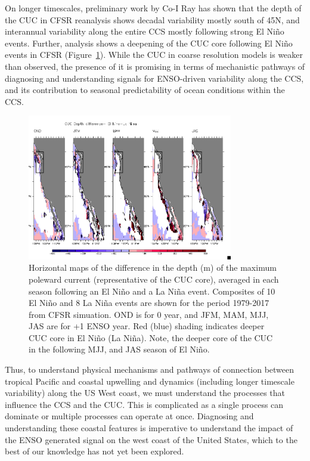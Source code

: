 On longer timescales, preliminary work by Co-I Ray has shown that the depth of the CUC in CFSR reanalysis shows decadal variability mostly south of 45N, and interannual variability along the entire CCS mostly following strong El Ni{\~n}o events. Further, analysis shows a deepening of the CUC core following El Ni{\~n}o events in CFSR (Figure~\ref{fig:CUC_enso}).  While the CUC in coarse resolution models is weaker than observed, the presence of it is promising in terms of mechanistic pathways of diagnosing and understanding signals for ENSO-driven variability along the CCS, and its contribution to seasonal predictability of ocean conditions within the CCS. 


\begin{figure}[h]
  \centering
  \includegraphics[width=0.8\textwidth]{CUCdepth_difference_EL_LA.png}
  \caption{Horizontal maps of the difference in the depth (m) of the maximum poleward current (representative of the CUC core), averaged in each season following an El Ni{\~n}o and a La Ni{\~n}a event. Composites of 10 El Ni{\~n}o and 8 La Ni{\~n}a events are shown for the period 1979-2017 from CFSR simuation. OND is for 0 year, and JFM, MAM, MJJ, JAS are for +1 ENSO year. Red (blue) shading indicates deeper CUC core in El Ni{\~n}o (La Ni{\~n}a). Note, the deeper core of the CUC in the following MJJ, and JAS season of El Ni{\~n}o. }
  \label{fig:CUC_enso}
\end{figure}

Thus, to understand physical mechanisms and pathways of connection between tropical Pacific and coastal upwelling and dynamics (including longer timescale variability) along the US West coast, we must understand the processes that influence the CCS and the CUC.  This is complicated as a single process can dominate or multiple processes can operate at once.  Diagnosing and understanding these coastal features is imperative to understand the impact of the ENSO generated signal on the west coast of the United States, which to the best of our knowledge has not yet been explored. 

